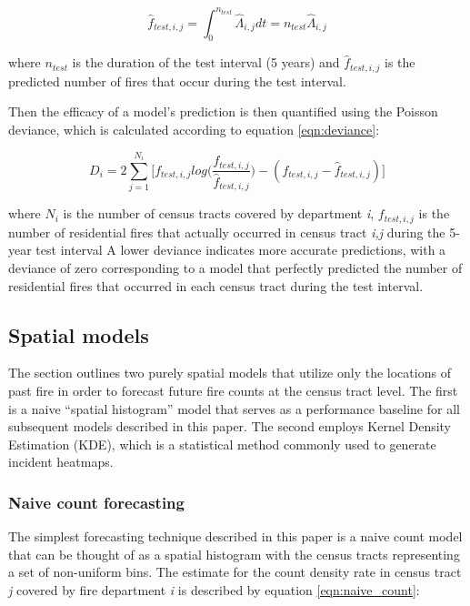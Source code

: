 \documentclass{svjour3}
\begin{document}
\begin{equation}
  \label{eqn:rate_integral}
  \hat{f}_{test,i,j} = \int_{0}^{n_{test}}\hat\Lambda_{i,j}dt
  = n_{test}\hat\Lambda_{i,j}
\end{equation}

\noindent where $n_{test}$ is the duration of the test interval (5 years) and $\hat{f}_{test,i,j}$ is the predicted number of fires that occur during the test interval.

Then the efficacy of a model's prediction is then quantified using the Poisson deviance, which is calculated according to equation \ref{eqn:deviance}:

\begin{equation}
  \label{eqn:deviance}
  D_i = 2\sum_{j=1}^{N_i}\bigg[
   f_{test,i,j}log\big(\frac{f_{test,i,j}}{\hat{f}_{test,i,j}}\big) - 
   (f_{test,i,j}-\hat{f}_{test,i,j}) 
  \bigg]
\end{equation}

\noindent where $N_i$ is the number of census tracts covered by department \textit{i}, $f_{test,i,j}$ is the number of residential fires that actually occurred in census tract \textit{i,j} during the 5-year test interval A lower deviance indicates more accurate predictions, with a deviance of zero corresponding to a model that perfectly predicted the number of residential fires that occurred in each census tract during the test interval.



\subsection{Spatial models}
The section outlines two purely spatial models that utilize only the locations of past fire in order to forecast future fire counts at the census tract level. The first is a naive ``spatial histogram'' model that serves as a performance baseline for all subsequent models described in this paper. The second employs Kernel Density Estimation (KDE), which is a statistical method commonly used to generate incident heatmaps. 

\subsubsection{Naive count forecasting}
The simplest forecasting technique described in this paper is a naive count model that can be thought of as a spatial histogram with the census tracts representing a set of non-uniform bins. The estimate for the count density rate in census tract \textit{j} covered by fire department \textit{i} is described by equation \ref{eqn:naive_count}:
\end{document}
